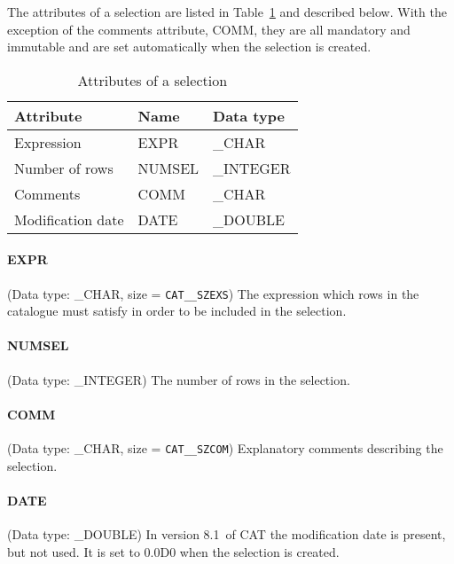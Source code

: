 \documentclass[11pt,twoside]{starlink}
\providecommand{\CATversion}{8.1~}
\begin{document}
The attributes of a selection are listed in Table~\ref{SELECT_ATT}
and described below. With the exception of the comments attribute,
COMM, they are all mandatory and immutable and are set automatically
when the selection is created.

\begin{table}[htbp]

\begin{center}
\begin{tabular}{lll}
Attribute         & Name    & Data type  \\ \hline
Expression        & EXPR    & \_CHAR     \\
Number of rows    & NUMSEL  & \_INTEGER  \\
Comments          & COMM    & \_CHAR     \\
Modification date & DATE    & \_DOUBLE   \\
\end{tabular}
\end{center}

\caption{\label{SELECT_ATT}Attributes of a selection}

\end{table}

\paragraph{EXPR}
(Data type: \_CHAR, size = \texttt{CAT\_\_SZEXS})
The expression which rows in the catalogue must satisfy in order to be
included in the selection.

\paragraph{NUMSEL}
(Data type: \_INTEGER)
The number of rows in the selection.

\paragraph{COMM}
(Data type: \_CHAR, size = \texttt{CAT\_\_SZCOM})
Explanatory comments describing the selection.

\paragraph{DATE}
(Data type: \_DOUBLE)
In version \CATversion of CAT the modification date is present, but
not used. It is set to 0.0D0 when the selection is created.
\end{document}
